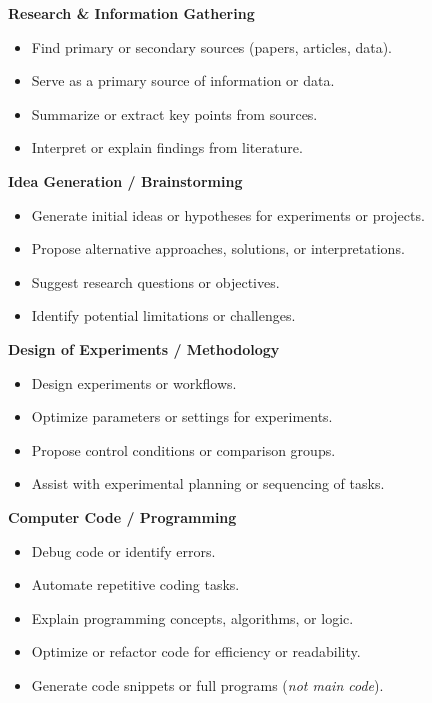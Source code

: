 \documentclass[11pt,a4paper]{article}
\begin{document}
\textbf{Research \& Information Gathering}
\begin{itemize}
  \item[$\blacksquare$] Find primary or secondary sources (papers, articles, data).
  \item[$\blacksquare$] Serve as a primary source of information or data.
  \item[$\square$] Summarize or extract key points from sources.
  \item[$\square$] Interpret or explain findings from literature.
\end{itemize}

\textbf{Idea Generation / Brainstorming}
\begin{itemize}
  \item[$\square$] Generate initial ideas or hypotheses for experiments or projects.
  \item[$\square$] Propose alternative approaches, solutions, or interpretations.
  \item[$\square$] Suggest research questions or objectives.
  \item[$\blacksquare$] Identify potential limitations or challenges.
\end{itemize}

\textbf{Design of Experiments / Methodology}
\begin{itemize}
  \item[$\square$] Design experiments or workflows.
  \item[$\blacksquare$] Optimize parameters or settings for experiments.
  \item[$\square$] Propose control conditions or comparison groups.
  \item[$\blacksquare$] Assist with experimental planning or sequencing of tasks.
\end{itemize}

\textbf{Computer Code / Programming}
\begin{itemize}
  \item[$\blacksquare$] Debug code or identify errors.
  \item[$\blacksquare$] Automate repetitive coding tasks.
  \item[$\blacksquare$] Explain programming concepts, algorithms, or logic.
  \item[$\blacksquare$] Optimize or refactor code for efficiency or readability.
  \item[$\blacksquare$] Generate code snippets or full programs (\textit{not main code}).
\end{itemize}
\end{document}
